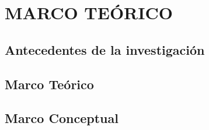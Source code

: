 \chapter{MARCO TEÓRICO}
\section{Antecedentes de la investigación}


\section{Marco Teórico}


\section{Marco Conceptual}

